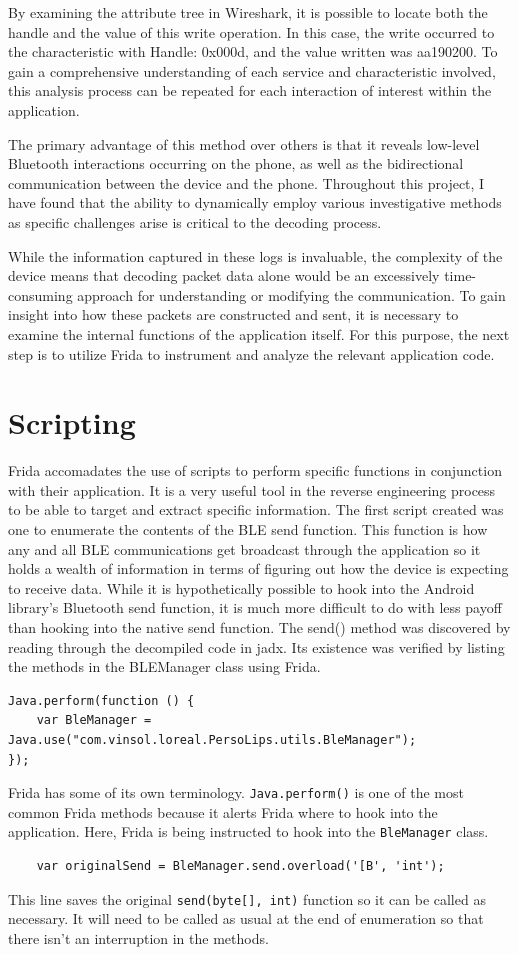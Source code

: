 By examining the attribute tree in Wireshark, it is possible to locate both the handle and the value of this write operation. In this case, the write occurred to the characteristic with Handle: 0x000d, and the value written was aa190200. To gain a comprehensive understanding of each service and characteristic involved, this analysis process can be repeated for each interaction of interest within the application.

The primary advantage of this method over others is that it reveals low-level Bluetooth interactions occurring on the phone, as well as the bidirectional communication between the device and the phone. Throughout this project, I have found that the ability to dynamically employ various investigative methods as specific challenges arise is critical to the decoding process.

While the information captured in these logs is invaluable, the complexity of the device means that decoding packet data alone would be an excessively time-consuming approach for understanding or modifying the communication. To gain insight into how these packets are constructed and sent, it is necessary to examine the internal functions of the application itself. For this purpose, the next step is to utilize Frida to instrument and analyze the relevant application code.

\section{Scripting}
Frida accomadates the use of scripts to perform specific functions in conjunction with their application. It is a very useful tool in the reverse engineering process to be able to target and extract specific information. The first script created was one to enumerate the contents of the BLE send function. This function is how any and all BLE communications get broadcast through the application so it holds a wealth of information in terms of figuring out how the device is expecting to receive data. While it is hypothetically possible to hook into the Android library's Bluetooth send function, it is much more difficult to do with less payoff than hooking into the native send function. The send() method was discovered by reading through the decompiled code in jadx. Its existence was verified by listing the methods in the BLEManager class using Frida.
\begin{verbatim}
Java.perform(function () {
    var BleManager = Java.use("com.vinsol.loreal.PersoLips.utils.BleManager");
});
\end{verbatim}
Frida has some of its own terminology. \texttt{Java.perform()} is one of the most common Frida methods because it alerts Frida where to hook into the application. Here, Frida is being instructed to hook into the \texttt{BleManager} class.
\begin{verbatim}
    var originalSend = BleManager.send.overload('[B', 'int');
\end{verbatim}
This line saves the original \texttt{send(byte[], int)} function so it can be called as necessary. It will need to be called as usual at the end of enumeration so that there isn’t an interruption in the methods.
	
